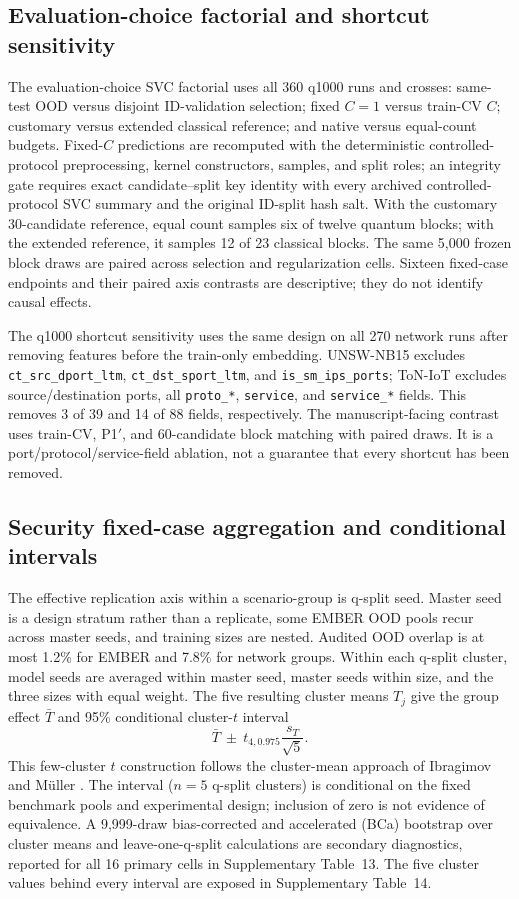 \documentclass[referee,lineno,pdflatex,sn-vancouver-num]{sn-jnl}
\theoremstyle{thmstyleone}%
\theoremstyle{thmstyletwo}%
\theoremstyle{thmstylethree}%
\begin{document}
\subsection{Evaluation-choice factorial and shortcut sensitivity}

The evaluation-choice SVC factorial uses all 360 q1000 runs and crosses: same-test OOD versus disjoint ID-validation selection; fixed $C=1$ versus train-CV $C$; customary versus extended classical reference; and native versus equal-count budgets. Fixed-$C$ predictions are recomputed with the deterministic controlled-protocol preprocessing, kernel constructors, samples, and split roles; an integrity gate requires exact candidate--split key identity with every archived controlled-protocol SVC summary and the original ID-split hash salt. With the customary 30-candidate reference, equal count samples six of twelve quantum blocks; with the extended reference, it samples 12 of 23 classical blocks. The same 5,000 frozen block draws are paired across selection and regularization cells. Sixteen fixed-case endpoints and their paired axis contrasts are descriptive; they do not identify causal effects.

The q1000 shortcut sensitivity uses the same design on all 270 network runs after removing features before the train-only embedding. UNSW-NB15 excludes \texttt{ct\_src\_dport\_ltm}, \texttt{ct\_dst\_sport\_ltm}, and \texttt{is\_sm\_ips\_ports}; ToN-IoT excludes source/destination ports, all \texttt{proto\_*}, \texttt{service}, and \texttt{service\_*} fields. This removes 3 of 39 and 14 of 88 fields, respectively. The manuscript-facing contrast uses train-CV, P1$'$, and 60-candidate block matching with paired draws. It is a port/protocol/service-field ablation, not a guarantee that every shortcut has been removed.

\subsection{Security fixed-case aggregation and conditional intervals}

The effective replication axis within a scenario-group is q-split seed. Master seed is a design stratum rather than a replicate, some EMBER OOD pools recur across master seeds, and training sizes are nested. Audited OOD overlap is at most 1.2\% for EMBER and 7.8\% for network groups. Within each q-split cluster, model seeds are averaged within master seed, master seeds within size, and the three sizes with equal weight. The five resulting cluster means $T_j$ give the group effect $\bar T$ and 95\% conditional cluster-$t$ interval
\[
\bar T\ \pm\ t_{4,0.975}\frac{s_T}{\sqrt{5}}.
\]
This few-cluster $t$ construction follows the cluster-mean approach of Ibragimov and M{\"u}ller \cite{ibragimov2016fewclusters}. The interval ($n=5$ q-split clusters) is conditional on the fixed benchmark pools and experimental design; inclusion of zero is not evidence of equivalence. A 9,999-draw bias-corrected and accelerated (BCa) bootstrap over cluster means and leave-one-q-split calculations are secondary diagnostics, reported for all 16 primary cells in Supplementary Table~13. The five cluster values behind every interval are exposed in Supplementary Table~14.
\end{document}

